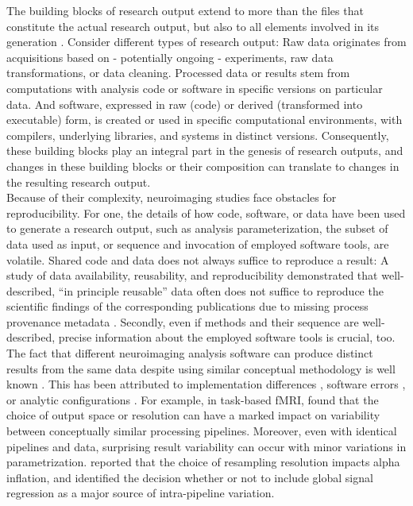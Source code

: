 The building blocks of research output extend to more than the files that constitute the actual research output, but also to all elements involved in its generation \citep{claerbout1992electronic}.
Consider different types of research output:
Raw data originates from acquisitions based on - potentially ongoing - experiments, raw data transformations, or data cleaning.
Processed data or results stem from computations with analysis code or software in specific versions on particular data.
And software, expressed in raw (code) or derived (transformed into executable) form, is created or used in specific computational environments, with compilers, underlying libraries, and systems in distinct versions.
Consequently, these building blocks play an integral part in the genesis of research outputs, and changes in these building blocks or their composition can translate to changes in the resulting research output.\\
Because of their complexity, neuroimaging studies face obstacles for reproducibility.
For one, the details of how code, software, or data have been used to generate a research output, such as analysis parameterization, the subset of data used as input, or sequence and invocation of employed software tools, are volatile.
Shared code and data does not always suffice to reproduce a result:
A study of data availability, reusability, and reproducibility demonstrated that well-described, ``in principle reusable'' data often does not suffice to reproduce the scientific findings of the corresponding publications due to  missing process provenance metadata \citep{hardwicke2018data}.
Secondly, even if methods and their sequence are well-described, precise information about the employed software tools is crucial, too.
The fact that different neuroimaging analysis software can produce distinct results from the same data despite using similar conceptual methodology is well known \citep{bowring2019exploring}.
This has been attributed to implementation differences \citep{palumbo2019evaluation}, software errors \citep{eklund2016cluster}, or analytic configurations \citep{pauli2016exploring}.
For example, in task-based fMRI, \citet{li2021moving} found that the choice of output space or resolution can have a marked impact on variability between conceptually similar processing pipelines.
Moreover, even with identical pipelines and data, surprising result variability can occur with minor variations in parametrization.
\citet{mueller2017commentary} reported that the choice of resampling resolution impacts alpha inflation, and \citet{li2021moving} identified the decision whether or not to include global signal regression as a major source of intra-pipeline variation.
